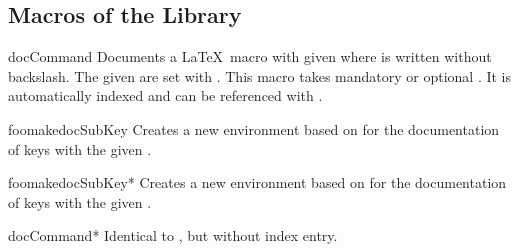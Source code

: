 \subsection{Macros of the Library}
\begin{docEnvironment}[doclang/environment content=command description]{docCommand}{}
  Documents a \LaTeX\ macro with given  where  is
  written without backslash. The given  are set with .
  This macro takes mandatory or optional .
  It is automatically indexed and can be referenced with
  .
\begin{dispExample}
\begin{docCommand}{foomakedocSubKey}{}
  Creates a new environment  based on  for the
  documentation of keys with the given .
\end{docCommand}
\end{dispExample}
\begin{dispExample}
\begin{docCommand}[color definition=blue]{foomakedocSubKey*}%
    {}
  Creates a new environment  based on  for the
  documentation of keys with the given .
\end{docCommand}
\end{dispExample}
\end{docEnvironment}


\begin{docEnvironment}[doclang/environment content=command description]{docCommand*}{}
  Identical to , but without index entry.
\end{docEnvironment}


